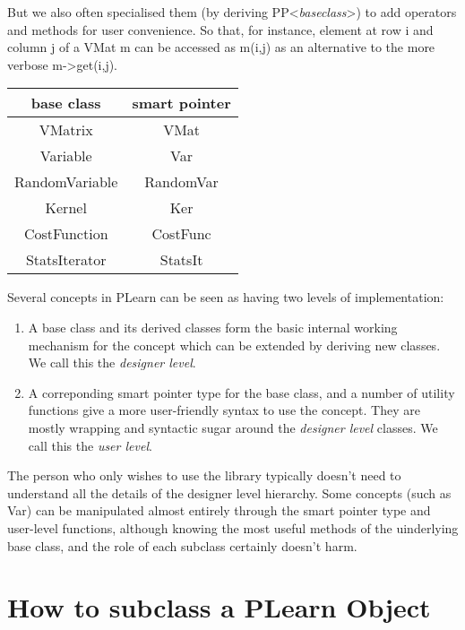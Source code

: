 \documentclass[11pt]{book}
\newcommand{\Object}{{\bf Object}}
\begin{document}
But we also often specialised them (by deriving PP<\emph{baseclass}>)
to add operators and methods for user convenience. So that, for
instance, element at row i and column j of a VMat m can be accessed
as m(i,j) as an alternative to the more verbose m->get(i,j).

\begin{tabular}{|c|c|}
\hline
base class &smart pointer \\
 \hline
VMatrix &VMat \\
 \hline
Variable &Var \\
 \hline
RandomVariable &RandomVar \\
 \hline
Kernel &Ker \\
 \hline
CostFunction &CostFunc \\
 \hline
StatsIterator &StatsIt \\
 \hline

\end{tabular}




Several concepts in PLearn can be seen as having two levels of
implementation:

 \begin{enumerate}

\item A base class and its derived classes form the basic internal
working mechanism for the concept which can be extended by deriving new
classes. We call this the \emph{designer level}.

\item A correponding smart pointer type for the base class, and a
number of utility functions give a more user-friendly syntax to use
the concept. They are mostly wrapping and syntactic sugar around the
\emph{designer level} classes. We call this the \emph{user level}.

\end{enumerate}

The person who only wishes to use the library typically doesn't need
to understand all the details of the designer level hierarchy. Some
concepts (such as Var) can be manipulated almost entirely through the
smart pointer type and user-level functions, although knowing the most
useful methods of the uinderlying base class, and the role of each
subclass certainly doesn't harm.

\section{How to subclass a PLearn \Object}
\label{Object}
\end{document}
